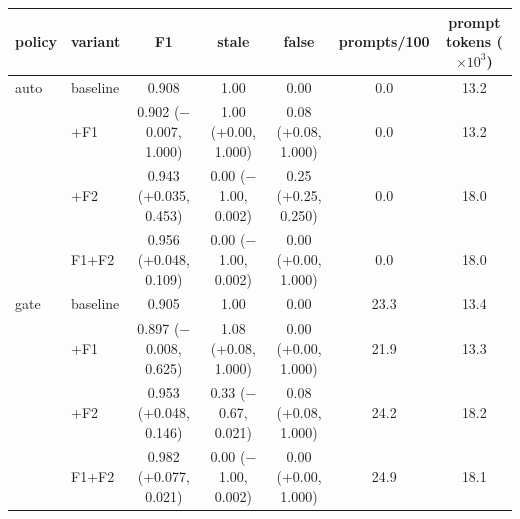 \begin{tabular}{llccccc}
\toprule
policy & variant & F1 & stale & false & prompts/100 & prompt tokens ($\times10^3$) \\
\midrule
auto & baseline & 0.908 & 1.00 & 0.00 & 0.0 & 13.2 \\
 & +F1 & 0.902 ($-$0.007, 1.000) & 1.00 (+0.00, 1.000) & 0.08 (+0.08, 1.000) & 0.0 & 13.2 \\
 & +F2 & 0.943 (+0.035, 0.453) & 0.00 ($-$1.00, 0.002) & 0.25 (+0.25, 0.250) & 0.0 & 18.0 \\
 & F1+F2 & 0.956 (+0.048, 0.109) & 0.00 ($-$1.00, 0.002) & 0.00 (+0.00, 1.000) & 0.0 & 18.0 \\
\addlinespace[2pt]
gate & baseline & 0.905 & 1.00 & 0.00 & 23.3 & 13.4 \\
 & +F1 & 0.897 ($-$0.008, 0.625) & 1.08 (+0.08, 1.000) & 0.00 (+0.00, 1.000) & 21.9 & 13.3 \\
 & +F2 & 0.953 (+0.048, 0.146) & 0.33 ($-$0.67, 0.021) & 0.08 (+0.08, 1.000) & 24.2 & 18.2 \\
 & F1+F2 & 0.982 (+0.077, 0.021) & 0.00 ($-$1.00, 0.002) & 0.00 (+0.00, 1.000) & 24.9 & 18.1 \\
\bottomrule
\end{tabular}
